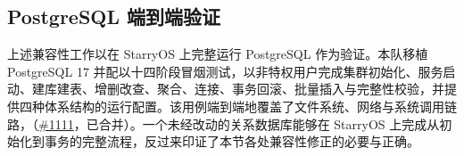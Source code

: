 \subsection{PostgreSQL 端到端验证}

上述兼容性工作以在 StarryOS 上完整运行 PostgreSQL 作为验证。本队移植 PostgreSQL 17 并配以十四阶段冒烟测试，以非特权用户完成集群初始化、服务启动、建库建表、增删改查、聚合、连接、事务回滚、批量插入与完整性校验，并提供四种体系结构的运行配置。该用例端到端地覆盖了文件系统、网络与系统调用链路，（\href{https://github.com/rcore-os/tgoskits/pull/1111}{\#1111}，已合并）。一个未经改动的关系数据库能够在 StarryOS 上完成从初始化到事务的完整流程，反过来印证了本节各处兼容性修正的必要与正确。

